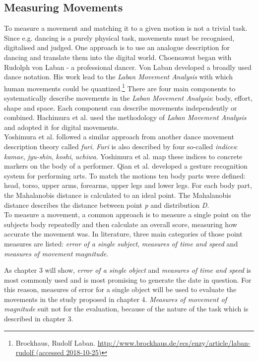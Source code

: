\subsection{Measuring Movements}
\label{sec:measuringmovements}
To measure a movement and matching it to a given motion is not a trivial task. Since e.g. dancing is a purely physical task, movements must be recognised, digitalised and judged. One approach is to use an analogue description for dancing and translate them into the digital world. Choensawat\cite{Choensawat2015} began with Rudolph von Laban - a professional dancer. Von Laban developed a broadly used dance notation. His work lead to the \textit{Laban Movement Analysis} with which human movements could be quantized.\footnote{Brockhaus, Rudolf Laban. \hyperlink{http://www.brockhaus.de/ecs/enzy/article/laban-rudolf}{http://www.brockhaus.de/ecs/enzy/article/laban-rudolf (accessed 2018-10-25)}} There are four main components to systematically describe movements in the \textit{Laban Movement Analysis}: body, effort, shape and space. Each component can describe movements independently or combined. Hachimura et al. \cite{Hachimura2004} used the methodology of \textit{Laban Movement Analysis} and adopted it for digital movements.\\
Yoshimura et al. \cite{Yoshimura2006} followed a similar approach from another dance movement description theory called \textit{furi}. \textit{Furi} is also described by four so-called \textit{indices}: \textit{kamae}, \textit{jyu-shin}, \textit{koshi}, \textit{uchiwa}. Yoshimura et al. map these indices to concrete markers on the body of a performer. Qian et al. \cite{Qian2005} developed a gesture recognition system for performing arts. To match the motions ten body parts were defined: head, torso, upper arms, forearms, upper legs and lower legs. For each body part, the Mahalanobis distance is calculated to an ideal point. The Mahalanobis distance describes the distance between point \textit{p} and distribution \textit{D}.\\
To measure a movement, a common approach is to measure a single point on the subjects body repeatedly and then calculate an overall score, measuring how accurate the movement was. In literature, three main categories of those point measures are listed: \textit{error of a single subject}, \textit{measures of time and speed} and \textit{measures of movement magnitude}.
\begin{tcolorbox}[colback=red!30!white]
As chapter 3 will show, \textit{error of a single object} and \textit{measures of time and speed} is most commonly used and is most promising to generate the date in question. For this reason, measures of error for a single object will be used to evaluate the movements in the study proposed in chapter 4. \textit{Measures of movement of magnitude} suit not for the evaluation, because of the nature of the task which is described in chapter 3.
\end{tcolorbox}

